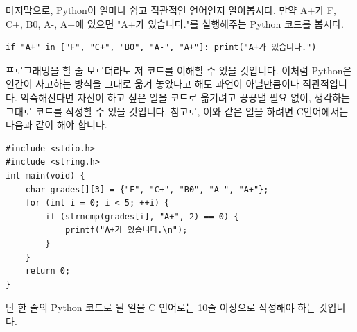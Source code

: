 \documentclass[../main.tex]{subfiles}
\begin{document}
마지막으로, Python이 얼마나 쉽고 직관적인 언어인지 알아봅시다.
만약 A+가 F, C+, B0, A-, A+에 있으면 "A+가 있습니다."를 실행해주는 Python 코드를 봅시다.
\begin{verbatim}
if "A+" in ["F", "C+", "B0", "A-", "A+"]: print("A+가 있습니다.")
\end{verbatim}
프로그래밍을 할 줄 모르더라도 저 코드를 이해할 수 있을 것입니다.
이처럼 Python은 인간이 사고하는 방식을 그대로 옮겨 놓았다고 해도 과언이 아닐만큼이나 직관적입니다.
익숙해진다면 자신이 하고 싶은 일을 코드로 옮기려고 끙끙댈 필요 없이, 생각하는 그대로 코드를 작성할 수 있을 것입니다.
참고로, 이와 같은 일을 하려면 C언어에서는 다음과 같이 해야 합니다.
\begin{verbatim}
#include <stdio.h>
#include <string.h>
int main(void) {
    char grades[][3] = {"F", "C+", "B0", "A-", "A+"};
    for (int i = 0; i < 5; ++i) {
        if (strncmp(grades[i], "A+", 2) == 0) {
            printf("A+가 있습니다.\n");
        }
    }
    return 0;
}
\end{verbatim}
단 한 줄의 Python 코드로 될 일을 C 언어로는 10줄 이상으로 작성해야 하는 것입니다.
\end{document}
